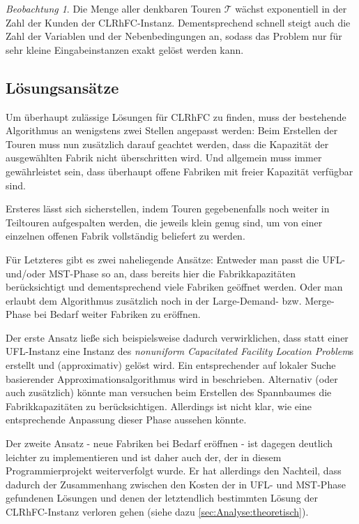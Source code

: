 \documentclass[a4paper,ngerman,11pt,bibtotoc]{scrartcl}
\theoremstyle{definition}
\theoremstyle{plain}
\theoremstyle{remark}
\newtheorem{beob}[defn]{Beobachtung}
\newcommand{\allTours}{\mathscr{T}}
\newcommand{\CLRHFC}{CLRhFC}
\newcommand{\MST}{MST}
\newcommand{\UFL}{UFL}
\begin{document}
\begin{beob}
	Die Menge aller denkbaren Touren $\allTours$ wächst exponentiell in der Zahl der Kunden der \CLRHFC-Instanz. Dementsprechend schnell steigt auch die Zahl der Variablen und der Nebenbedingungen an, sodass das Problem nur für sehr kleine Eingabeinstanzen exakt gelöst werden kann.
\end{beob}


	\subsection{Lösungsansätze}
	
	Um überhaupt zulässige Lösungen für \CLRHFC{} zu finden, muss der bestehende Algorithmus an wenigstens zwei Stellen angepasst werden: Beim Erstellen der Touren muss nun zusätzlich darauf geachtet werden, dass die Kapazität der ausgewählten Fabrik nicht überschritten wird. Und allgemein muss immer gewährleistet sein, dass überhaupt offene Fabriken mit freier Kapazität verfügbar sind.
	
	Ersteres lässt sich sicherstellen, indem Touren gegebenenfalls noch weiter in Teiltouren aufgespalten werden, die jeweils klein genug sind, um von einer einzelnen offenen Fabrik vollständig beliefert zu werden.
	
	Für Letzteres gibt es zwei naheliegende Ansätze: Entweder man passt die \UFL- und/oder \MST-Phase so an, dass bereits hier die Fabrikkapazitäten berücksichtigt und dementsprechend viele Fabriken geöffnet werden. Oder man erlaubt dem Algorithmus zusätzlich noch in der Large-Demand- bzw. Merge-Phase bei Bedarf weiter Fabriken zu eröffnen. 
	
	Der erste Ansatz ließe sich beispielsweise dadurch verwirklichen, dass statt einer \UFL-Instanz eine Instanz des \emph{nonuniform Capacitated Facility Location Problem}s erstellt und (approximativ) gelöst wird. Ein entsprechender auf lokaler Suche basierender Approximationsalgorithmus wird in \cite{Pal01facilitylocation} beschrieben. Alternativ (oder auch zusätzlich) könnte man versuchen beim Erstellen des Spannbaumes die Fabrikkapazitäten zu berücksichtigen. Allerdings ist nicht klar, wie eine entsprechende Anpassung dieser Phase aussehen könnte.
	
	Der zweite Ansatz - neue Fabriken bei Bedarf eröffnen - ist dagegen deutlich leichter zu implementieren und ist daher auch der, der in diesem Programmierprojekt weiterverfolgt wurde. Er hat allerdings den Nachteil, dass dadurch der Zusammenhang zwischen den Kosten der in \UFL- und \MST-Phase gefundenen Lösungen und denen der letztendlich bestimmten Lösung der \CLRHFC-Instanz verloren gehen (siehe dazu \cref{sec:Analyse:theoretisch}).
\end{document}
